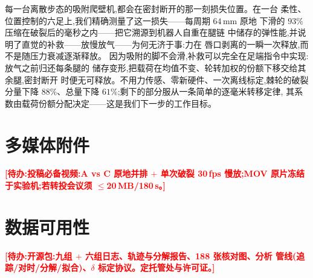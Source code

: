 \documentclass[journal]{IEEEtran}
\newcommand{\TODO}[1]{\textcolor{red}{\textbf{[待办:#1]}}}
\begin{document}
每一台离散步态的吸附爬壁机,都会在密封断开的那一刻损失位置。在一台
柔性、位置控制的六足上,我们精确测量了这一损失——每周期 $64$\,mm 原地
下滑的 $93\%$ 压缩在破裂后的毫秒之内——把它溯源到机器人自重在腿链
中储存的弹性能,并说明了直觉的补救——放慢放气——为何无济于事:力在
唇口剥离的一瞬一次释放,而不是随压力衰减逐渐释放。
因为吸附的脚不会滑,补救可以完全在足端指令中实现:放气之前归还每条腿的
储存变形,把载荷在均值不变、轮转加权的份额下移交给其余腿,密封断开
时便无可释放。不用力传感、零新硬件、一次离线标定,棘轮的破裂分量下降
$88\%$、总量下降 $61\%$;剩下的部分服从一条简单的逐毫米转移定律,
其系数由载荷份额分配决定——这是我们下一步的工作目标。

\section*{多媒体附件}
\TODO{投稿必备视频:A vs C 原地并排 $+$ 单次破裂 30\,fps 慢放;MOV
原片冻结于实验机;若转投会议须 $\le$20\,MB/180\,s。}

\section*{数据可用性}
\TODO{开源包:九组 $+$ 六组日志、轨迹与分解报告、188 张核对图、分析
管线(追踪/对时/分解/拟合)、$\delta$ 标定协议。定托管处与许可证。}



\end{document}

